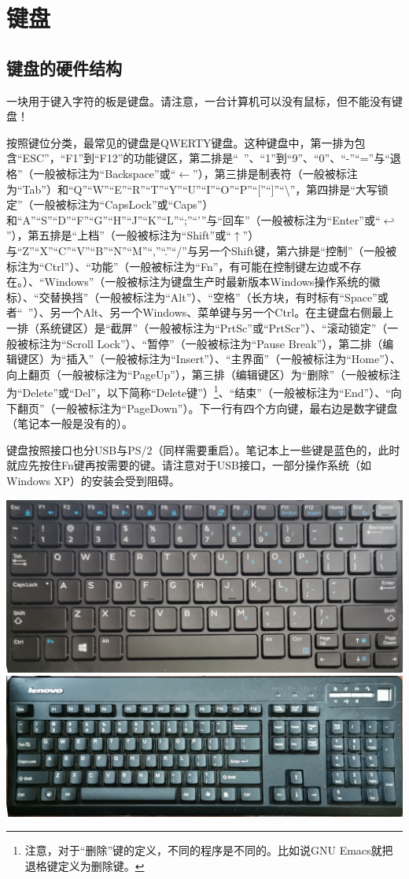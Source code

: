 \section{键盘}
\subsection{键盘的硬件结构}
一块用于键入字符的板是键盘。请注意，一台计算机可以没有鼠标，但不能没有键盘！\par
按照键位分类，最常见的键盘是QWERTY键盘。这种键盘中，第一排为包含“ESC”，“F1”到“F12”的功能键区，第二排是“~”、“1”到“9”、“0”、“-”“=”与“退格”（一般被标注为“Backspace”或“$\leftarrow$”），第三排是制表符（一般被标注为“Tab”）和“Q”“W”“E”“R”“T”“Y”“U”“I”“O”“P”“[”“]”“\textbackslash”，第四排是“大写锁定”（一般被标注为“CapsLock”或“Caps”）和“A”“S”“D”“F”“G”“H”“J”“K”“L”“;”“'”与“回车”（一般被标注为“Enter”或“$\hookleftarrow$”），第五排是“上档”（一般被标注为“Shift”或“$\uparrow$”）与“Z”“X”“C”“V”“B”“N”“M”“,”“.”“/”与另一个Shift键，第六排是“控制”（一般被标注为“Ctrl”）、“功能”（一般被标注为“Fn”，有可能在控制键左边或不存在。）、“Windows”（一般被标注为键盘生产时最新版本Windows操作系统的徽标）、“交替换挡”（一般被标注为“Alt”）、“空格”（长方块，有时标有“Space”或者“\verb*| |”）、另一个Alt、另一个Windows、菜单键与另一个Ctrl。在主键盘右侧最上一排（系统键区）是“截屏”（一般被标注为“PrtSc”或“PrtScr”）、“滚动锁定”（一般被标注为“Scroll Lock”）、“暂停”（一般被标注为“Pause Break”），第二排（编辑键区）为“插入”（一般被标注为“Insert”）、“主界面”（一般被标注为“Home”）、向上翻页（一般被标注为“PageUp”），第三排（编辑键区）为“删除”（一般被标注为“Delete”或“Del”，以下简称“Delete键”）\footnote{注意，对于“删除”键的定义，不同的程序是不同的。比如说GNU Emacs就把退格键定义为删除键。}、“结束”（一般被标注为“End”）、“向下翻页”（一般被标注为“PageDown”）。下一行有四个方向键，最右边是数字键盘（笔记本一般是没有的）。\par
键盘按照接口也分USB与PS/2（同样需要重启）。笔记本上一些键是蓝色的，此时就应先按住Fn键再按需要的键。请注意对于USB接口，一部分操作系统（如Windows XP）的安装会受到阻碍。
\begin{center}
	\includegraphics[width=0.7\linewidth]{pic/KB1}\\\includegraphics[width=0.7\linewidth]{pic/KB2}
\end{center}\par
